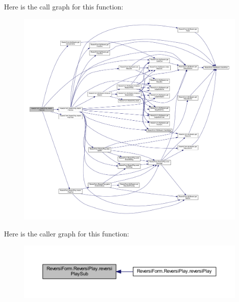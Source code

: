 Here is the call graph for this function\+:
\nopagebreak
\begin{figure}[H]
\begin{center}
\leavevmode
\includegraphics[width=350pt]{class_reversi_form_1_1_reversi_play_a4fe42268a8d957c555db025f8b35d34e_cgraph}
\end{center}
\end{figure}
Here is the caller graph for this function\+:
\nopagebreak
\begin{figure}[H]
\begin{center}
\leavevmode
\includegraphics[width=350pt]{class_reversi_form_1_1_reversi_play_a4fe42268a8d957c555db025f8b35d34e_icgraph}
\end{center}
\end{figure}
\mbox{\label{class_reversi_form_1_1_reversi_play_a08062d3bd42d1780a6931b44a925503d}} 
